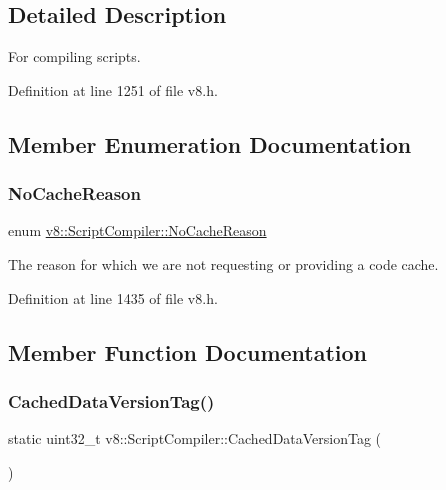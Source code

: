 \subsection{Detailed Description}
For compiling scripts. 

Definition at line 1251 of file v8.\+h.



\subsection{Member Enumeration Documentation}
\mbox{\label{classv8_1_1ScriptCompiler_a7f13fa15484cfc500ae51927756e0d60}} 
\subsubsection{\texorpdfstring{No\+Cache\+Reason}{NoCacheReason}}
{\footnotesize\ttfamily enum \mbox{\hyperlink{classv8_1_1ScriptCompiler_a7f13fa15484cfc500ae51927756e0d60}{v8\+::\+Script\+Compiler\+::\+No\+Cache\+Reason}}}

The reason for which we are not requesting or providing a code cache. 

Definition at line 1435 of file v8.\+h.



\subsection{Member Function Documentation}
\mbox{\label{classv8_1_1ScriptCompiler_aea78877b0dccde1e587ee1ddeda1c155}} 
\subsubsection{\texorpdfstring{Cached\+Data\+Version\+Tag()}{CachedDataVersionTag()}}
{\footnotesize\ttfamily static uint32\+\_\+t v8\+::\+Script\+Compiler\+::\+Cached\+Data\+Version\+Tag (\begin{DoxyParamCaption}{ }\end{DoxyParamCaption})\hspace{0.3cm}{\ttfamily [static]}}

